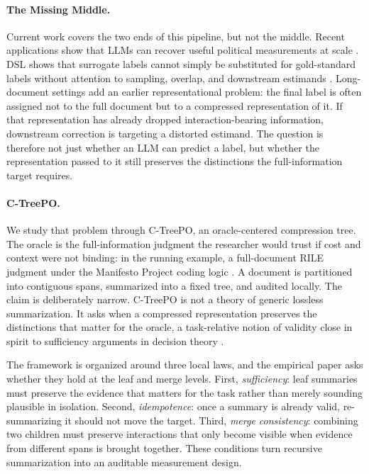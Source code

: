 \documentclass[11pt]{article}
\begin{document}
\paragraph{The Missing Middle.}
Current work covers the two ends of this pipeline, but not the middle. Recent applications show that LLMs can recover useful political measurements at scale \citep{BenoitEtAl2025}. DSL shows that surrogate labels cannot simply be substituted for gold-standard labels without attention to sampling, overlap, and downstream estimands \citep{EgamiEtAl2024}. Long-document settings add an earlier representational problem: the final label is often assigned not to the full document but to a compressed representation of it. If that representation has already dropped interaction-bearing information, downstream correction is targeting a distorted estimand. The question is therefore not just whether an LLM can predict a label, but whether the representation passed to it still preserves the distinctions the full-information target requires.

\paragraph{C-TreePO.}
We study that problem through C-TreePO, an oracle-centered compression tree. The oracle is the full-information judgment the researcher would trust if cost and context were not binding: in the running example, a full-document RILE judgment under the Manifesto Project coding logic \citep{ManifestoProject2025a}. A document is partitioned into contiguous spans, summarized into a fixed tree, and audited locally. The claim is deliberately narrow. C-TreePO is not a theory of generic lossless summarization. It asks when a compressed representation preserves the distinctions that matter for the oracle, a task-relative notion of validity close in spirit to sufficiency arguments in decision theory \citep{Blackwell1953}.

The framework is organized around three local laws, and the empirical paper asks whether they hold at the leaf and merge levels. First, \emph{sufficiency}: leaf summaries must preserve the evidence that matters for the task rather than merely sounding plausible in isolation. Second, \emph{idempotence}: once a summary is already valid, re-summarizing it should not move the target. Third, \emph{merge consistency}: combining two children must preserve interactions that only become visible when evidence from different spans is brought together. These conditions turn recursive summarization into an auditable measurement design.
\end{document}
